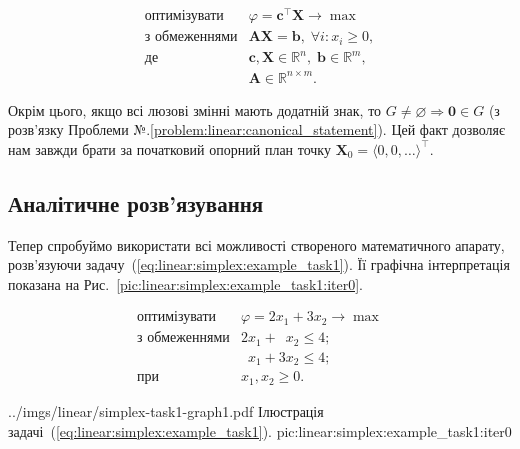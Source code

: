 \documentclass[\main/book.tex]{subfiles}
\begin{document}
\begin{equation}
 \begin{array}{rl}
  \text{оптимізувати}  & \varphi = \mathbf{c}^\top \mathbf{X} \rightarrow \max \\
  \text{з обмеженнями} & \mathbf{A} \mathbf{X} = \mathbf{b},\; \forall i: x_i \geq 0, \\
  \text{де}            & \mathbf{c}, \mathbf{X} \in \mathbb{R}^n, \; \mathbf{b} \in \mathbb{R}^m, \\
                       & \mathbf{A} \in \mathbb{R}^{n \times m}.
 \end{array}
 \label{eq:linear:simplex:canonical}
\end{equation}

\begin{note}
 Окрім цього, якщо всі люзові змінні мають додатній знак, то $G \neq \varnothing \Rightarrow \mathbf{0} \in G$ (з розв'язку Проблеми №.\ref{problem:linear:canonical_statement}). Цей факт дозволяє нам завжди брати за початковий опорний план точку $\mathbf{X}_0 = \langle 0, 0, \ldots \rangle^\top$.
\end{note}

\subsection{Аналітичне розв'язування}

Тепер спробуймо використати всі можливості створеного математичного апарату, розв'язуючи задачу~(\ref{eq:linear:simplex:example_task1}). Її графічна інтерпретація показана на Рис.~\ref{pic:linear:simplex:example_task1:iter0}.

\begin{equation}
 \begin{array}{rl}
  \text{оптимізувати}  & \varphi = 2 x_1 + 3 x_2 \rightarrow \max \\
  \text{з обмеженнями} & 2 x_1           + \phantom{3} x_2 \leq 4; \\
                       & \phantom{2} x_1 + 3           x_2 \leq 4; \\
  \text{при}           & x_1, x_2 \geq 0.
 \end{array}
 \label{eq:linear:simplex:example_task1}
\end{equation}

\illustration
 {../imgs/linear/simplex-task1-graph1.pdf}
 {Ілюстрація задачі~(\ref{eq:linear:simplex:example_task1}).}
 {pic:linear:simplex:example_task1:iter0}
\end{document}
